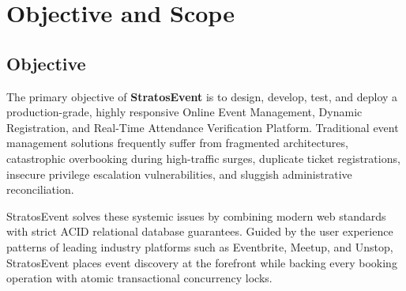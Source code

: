 \documentclass[11pt,a4paper]{article}
\begin{document}
\vspace{0.10in}

\tableofcontents

\newpage
\section*{{\color{TitleBlue}\bfseries
\fontsize{18}{22}\selectfont Objective and Scope}}

\subsection*{Objective}
\justifying

The primary objective of \textbf{StratosEvent} is to design, develop, test, and deploy a production-grade, highly responsive Online Event Management, Dynamic Registration, and Real-Time Attendance Verification Platform. Traditional event management solutions frequently suffer from fragmented architectures, catastrophic overbooking during high-traffic surges, duplicate ticket registrations, insecure privilege escalation vulnerabilities, and sluggish administrative reconciliation.

StratosEvent solves these systemic issues by combining modern web standards with strict ACID relational database guarantees. Guided by the user experience patterns of leading industry platforms such as Eventbrite, Meetup, and Unstop, StratosEvent places event discovery at the forefront while backing every booking operation with atomic transactional concurrency locks.
\end{document}
